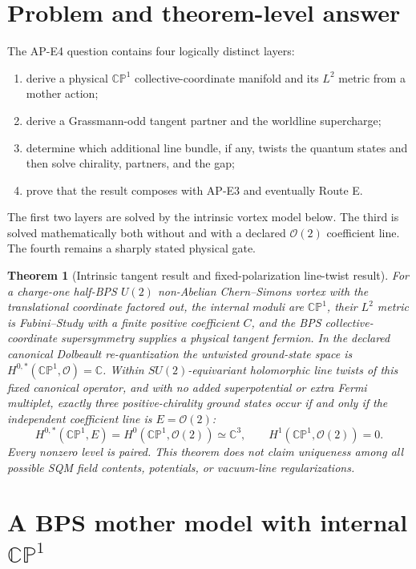 \documentclass[11pt]{article}
\newtheorem{theorem}{Theorem}[section]
\theoremstyle{definition}
\theoremstyle{remark}
\newcommand{\CC}{\mathbb C}
\newcommand{\CP}{\mathbb {CP}}
\newcommand{\cO}{\mathcal O}
\begin{document}
\tableofcontents

\section{Problem and theorem-level answer}

The AP-E4 question contains four logically distinct layers:
\begin{enumerate}[label=(E4.\arabic*)]
\item derive a physical \(\CP^1\) collective-coordinate manifold and its
  \(L^2\) metric from a mother action;
\item derive a Grassmann-odd tangent partner and the worldline supercharge;
\item determine which additional line bundle, if any, twists the quantum
  states and then solve chirality, partners, and the gap;
\item prove that the result composes with AP-E3 and eventually Route E.
\end{enumerate}
The first two layers are solved by the intrinsic vortex model below.  The
third is solved mathematically both without and with a declared \(\cO(2)\)
coefficient line.  The fourth remains a sharply stated physical gate.

\begin{theorem}[Intrinsic tangent result and fixed-polarization line-twist result]
For a charge-one half-BPS \(U(2)\) non-Abelian Chern--Simons vortex with the
translational coordinate factored out, the internal moduli are \(\CP^1\),
their \(L^2\) metric is Fubini--Study with a finite positive coefficient
\(C\), and the BPS collective-coordinate supersymmetry supplies a physical
tangent fermion.  In the declared canonical Dolbeault re-quantization the untwisted
ground-state space is
\(H^{0,*}(\CP^1,\cO)=\CC\).  Within \(SU(2)\)-equivariant holomorphic line
twists of this fixed canonical operator, and with no added superpotential or
extra Fermi multiplet, exactly three positive-chirality ground states occur
if and only if the independent coefficient line is \(E=\cO(2)\):
\[
 H^{0,*}(\CP^1,E)=H^0(\CP^1,\cO(2))\simeq\CC^3,
 \qquad H^1(\CP^1,\cO(2))=0.
\]
Every nonzero level is paired.  This theorem does not claim uniqueness among
all possible SQM field contents, potentials, or vacuum-line regularizations.
\end{theorem}

\section{A BPS mother model with internal \texorpdfstring{\(\CP^1\)}{CP1}}
\end{document}
